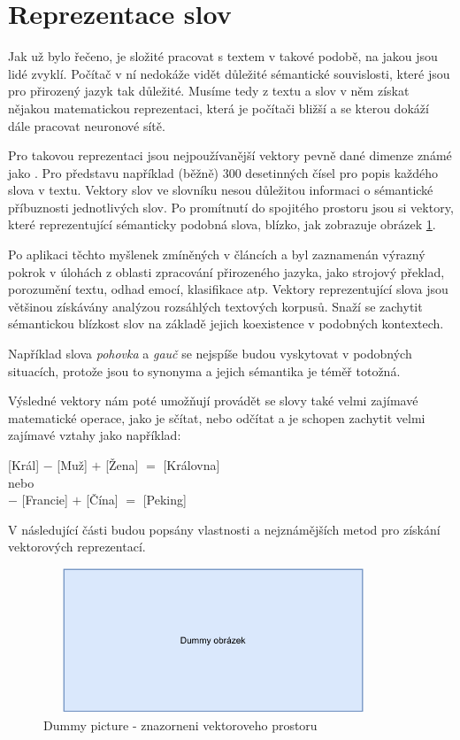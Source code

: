\section{Reprezentace slov}
\label{reprezentace_slov}
Jak už bylo řečeno, je složité pracovat s textem v takové podobě, na jakou jsou lidé zvyklí. Počítač v ní nedokáže vidět důležité sémantické souvislosti, které jsou pro přirozený jazyk tak důležité. Musíme tedy z textu a slov v něm získat nějakou matematickou reprezentaci, která je počítači bližší a se kterou dokáží dále pracovat neuronové sítě. \par
Pro takovou reprezentaci jsou nejpoužívanější vektory pevně dané dimenze známé jako . Pro představu například (běžně) 300 desetinných čísel pro popis každého slova v textu. Vektory slov ve slovníku nesou důležitou informaci o sémantické příbuznosti jednotlivých slov. Po promítnutí do spojitého prostoru jsou si vektory, které reprezentující sémanticky podobná slova, blízko, jak zobrazuje obrázek \ref{word_embeddings}.\par
Po aplikaci těchto myšlenek zmíněných v článcích \cite{mikolov2013embeddings} a \cite{mikolov2013_2} byl zaznamenán výrazný pokrok v úlohách z oblasti zpracování přirozeného jazyka, jako strojový překlad, porozumění textu, odhad emocí, klasifikace atp.
Vektory reprezentující slova jsou většinou získávány analýzou rozsáhlých textových korpusů. Snaží se zachytit sémantickou blízkost slov na základě jejich koexistence v podobných kontextech.\par 
Například slova \emph{pohovka} a \emph{gauč} se nejspíše budou vyskytovat v podobných situacích, protože jsou to synonyma a jejich sémantika je téměř totožná.\par
Výsledné vektory nám poté umožňují provádět se slovy také velmi zajímavé matematické operace, jako je sčítat, nebo odčítat a je schopen zachytit velmi zajímavé vztahy jako například:
\begin{center}
[Král] $-$ [Muž] $+$ [Žena] $=$ [Královna]\\
\medskip
nebo\\
\medskip
[Paříž] $-$ [Francie] $+$ [Čína] $=$ [Peking]
\end{center}

V následující části budou popsány vlastnosti a nejznámějších metod pro získání vektorových reprezentací.

\begin{figure}[hbt]
	\centering
	\includegraphics[width=4.0in, height=1.7in]{obrazky/dummy_pic.pdf}
	\caption{Dummy picture - znazorneni vektoroveho prostoru}
	\label{word_embeddings}
\end{figure}

